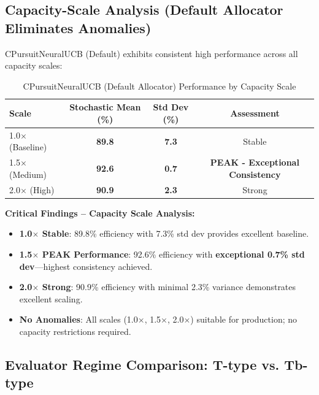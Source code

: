 \documentclass[12pt,a4paper]{article}
\newcommand{\success}[1]{\textcolor{accentgreen}{\textbf{#1}}}
\begin{document}
\subsection{Capacity-Scale Analysis (Default Allocator Eliminates Anomalies)}

CPursuitNeuralUCB (Default) exhibits consistent high performance across all capacity scales:

\begin{table}[H]
\centering
\caption{CPursuitNeuralUCB (Default Allocator) Performance by Capacity Scale}
\begin{tabular}{@{}lccc@{}}
\toprule
\textbf{Scale} & \textbf{Stochastic Mean (\%)} & \textbf{Std Dev (\%)} & \textbf{Assessment} \\
\midrule
1.0$\times$ (Baseline) & \success{89.8} & \success{7.3} & Stable \\
1.5$\times$ (Medium) & \success{92.6} & \success{0.7} & \success{PEAK - Exceptional Consistency} \\
2.0$\times$ (High) & \success{90.9} & \success{2.3} & Strong \\
\bottomrule
\end{tabular}
\end{table}

\textbf{Critical Findings – Capacity Scale Analysis:}

\begin{itemize}
    \item \success{1.0$\times$ Stable}: 89.8\% efficiency with 7.3\% std dev provides excellent baseline.
    
    \item \success{1.5$\times$ PEAK Performance}: 92.6\% efficiency with \textbf{exceptional 0.7\% std dev}—highest consistency achieved. 
    
    \item \success{2.0$\times$ Strong}: 90.9\% efficiency with minimal 2.3\% variance demonstrates excellent scaling.
    
    \item \success{No Anomalies}: All scales (1.0$\times$, 1.5$\times$, 2.0$\times$) suitable for production; no capacity restrictions required.
\end{itemize}

\subsection{Evaluator Regime Comparison: T-type vs. Tb-type}
\end{document}

